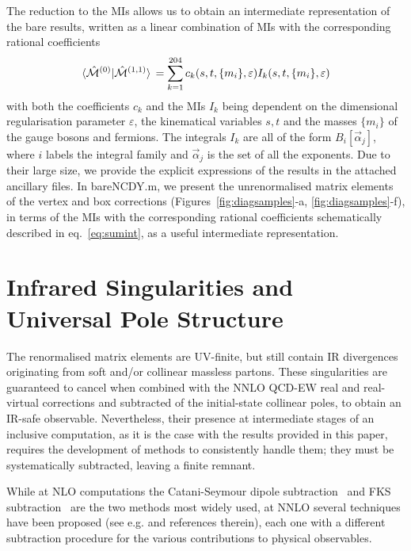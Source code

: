 \documentclass[11pt,a4paper]{article}
\begin{document}
%
The reduction to the MIs allows us to obtain an intermediate representation
of the bare results, written as a linear combination of MIs with the corresponding rational coefficients
\begin{equation}
\langle \hat{\cal M}^{(0)} | \hat{\cal M}^{(1,1)} \rangle \, = \sum_{k=1}^{204} c_k(s,t,\{m_i\},\varepsilon) I_k(s,t,\{m_i\},\varepsilon)
\label{eq:sumint}
\end{equation}
with both the coefficients $c_k$ and the MIs $I_k$ being dependent on the dimensional regularisation parameter $\varepsilon$,
the kinematical variables $s,t$ and the masses $\{m_i\}$ of the gauge bosons and fermions.
The integrals $I_k$ are all of the form $B_i[\vec\alpha_j]$,
where $i$ labels
the integral family and $\vec\alpha_j$ is the set of all the exponents.
%
%
Due to their large size, we provide the explicit expressions of the results in the attached ancillary files.
In \textsf{bareNCDY.m}, we present the unrenormalised matrix elements
of the vertex and box corrections (Figures~\ref{fig:diagsamples}-a, \ref{fig:diagsamples}-f),
in terms of the MIs with the corresponding rational coefficients schematically described in eq.~\eqref{eq:sumint},
as a useful intermediate representation.




\section{Infrared Singularities and Universal Pole Structure}
\label{sec:infra}
%
The renormalised matrix elements are UV-finite,
but still contain IR divergences
originating from soft and/or collinear massless partons.
These singularities are guaranteed to cancel
when combined with the NNLO QCD-EW real and real-virtual corrections
and subtracted of the initial-state collinear poles,
to obtain an IR-safe observable.
Nevertheless,
their presence at intermediate stages of an inclusive computation,
as it is the case with the results provided in this paper,
requires the development of methods to consistently handle them;
they must be systematically subtracted, leaving a finite remnant.


While at NLO computations the Catani-Seymour dipole subtraction~\cite{Catani:1996jh,Catani:1996vz,Catani:2002hc} and FKS subtraction~\cite{Frixione:1995ms} are the two methods most widely used, at NNLO several techniques have been proposed (see e.g. \cite{Proceedings:2018jsb} and references therein), each one with a different subtraction procedure for the various contributions to physical observables.
\end{document}
